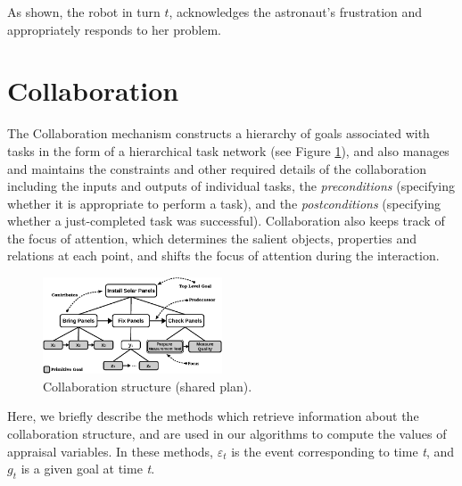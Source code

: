 \documentclass{aamas2016}
\begin{document}
\vspace*{-1mm}
As shown, the robot in turn $t$, acknowledges the astronaut's frustration and
appropriately responds to her problem.

\section{Collaboration}

The Collaboration mechanism constructs a hierarchy of goals associated with
tasks in the form of a hierarchical task network (see Figure \ref{fig:cs}), and
also manages and maintains the constraints and other required details of the
collaboration including the inputs and outputs of individual tasks, the
\textit{preconditions} (specifying whether it is appropriate to perform a task),
and the \textit{postconditions} (specifying whether a just-completed task was
successful). Collaboration also keeps track of the focus of attention, which
determines the salient objects, properties and relations at each point, and
shifts the focus of attention during the interaction.

\begin{figure}[tbh]
  \centering
  \includegraphics[width=0.474\textwidth]{figure/collaborationStructure-croped.pdf}
  \caption{{\fontsize{9}{9}\selectfont Collaboration structure (shared plan).}}
  \label{fig:cs}
\end{figure}

Here, we briefly describe the methods which retrieve information about the
collaboration structure, and are used in our algorithms to compute the values of
appraisal variables. In these methods, $\varepsilon_t$ is the event
corresponding to time \textit{t}, and $g_t$ is a given goal at time \textit{t}. 
\end{document}
